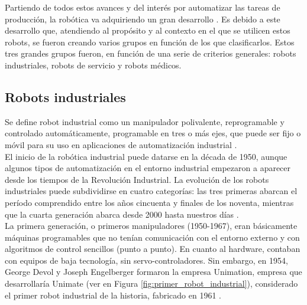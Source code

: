 Partiendo de todos estos avances y del interés por automatizar las tareas de producción, la robótica va adquiriendo un gran desarrollo \cite{Sanchez07b}. Es debido a este desarrollo que, atendiendo al propósito y al contexto en el que se utilicen estos robots, se fueron creando varios grupos en función de los que clasificarlos. Estos tres grandes grupos fueron, en función de una serie de criterios generales: robots industriales, robots de servicio y robots médicos.

\subsection{Robots industriales}
\label{sec:robots_industriales}

Se define robot industrial como un manipulador polivalente, reprogramable y controlado automáticamente, programable en tres o más ejes, que puede ser fijo o móvil para su uso en aplicaciones de automatización industrial \cite{ISO8373}.\\

El inicio de la robótica industrial puede datarse en la década de 1950, aunque algunos tipos de automatización en el entorno industrial empezaron a aparecer desde los tiempos de la Revolución Industrial. La evolución de los robots industriales puede subdividirse en cuatro categorías: las tres primeras abarcan el período comprendido entre los años cincuenta y finales de los noventa, mientras que la cuarta generación abarca desde 2000 hasta nuestros días \cite{Gasparetto19}.\\

La primera generación, o primeros manipuladores (1950-1967), eran básicamente máquinas programables que no tenían comunicación con el entorno externo y con algoritmos de control sencillos (punto a punto). En cuanto al hardware, contaban con equipos de baja tecnología, sin servo-controladores. Sin embargo, en 1954, George Devol y Joseph Engelberger formaron la empresa Unimation, empresa que desarrollaría Unimate (ver en Figura \ref{fig:primer_robot_industrial}), considerado el primer robot industrial de la historia, fabricado en 1961 \cite{Zamalloa17}.
  
